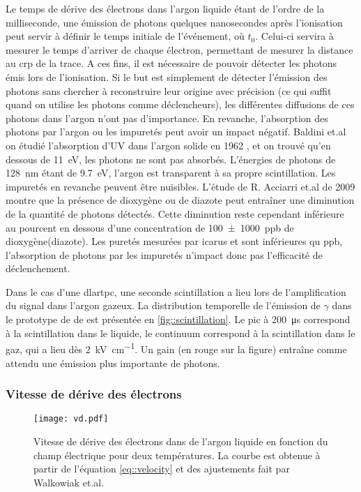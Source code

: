         Le temps de dérive des électrons dans l'argon liquide étant de l'ordre de la milliseconde, une émission de photons quelques nanosecondes après l'ionisation peut servir à définir le temps initiale de l'événement, où $t_0$. Celui-ci servira à mesurer le temps d'arriver de chaque électron, permettant de mesurer la distance au \gls{crp} de la trace. A ces fins, il est nécessaire de pouvoir détecter les photons émis lors de l'ionisation. Si le but est simplement de détecter l'émission des photons sans chercher à reconstruire leur origine avec précision (ce qui suffit quand on utilise les photons comme déclencheurs), les différentes diffusions de ces photons dans l'argon n'ont pas d'importance. En revanche, l'absorption des photons par l'argon ou les impuretés peut avoir un impact négatif. Baldini et.al on étudié l'absorption d'UV dans l'argon solide en 1962 \cite{Baldini1962}, et on trouvé qu'en dessous de \SI{11}{\eV}, les photons ne sont pas absorbés. L'énergies de photons de \SI{128}{\nano\meter} étant de \SI{9.7}{\eV}, l'argon est transparent à sa propre scintillation. Les impuretés en revanche peuvent être nuisibles. L'étude de R. Acciarri et.al de 2009\cite{Acciarri2009} montre que la présence de dioxygène ou de diazote peut entraîner une diminution de la quantité de photons détectés. Cette diminution reste cependant inférieure au pourcent en dessous d'une concentration de \SI{100(1000)}{ppb} de dioxygène(diazote). Les puretés mesurées par \gls{icarus}\cite{Antonello2014} et \protosp{} sont inférieures qu \si{ppb}, l'absorption de photons par les impuretés n'impact donc pas l'efficacité de déclenchement.

        Dans le cas d'une \gls{dlartpc}, une seconde scintillation a lieu lors de l'amplification du signal dans l'argon gazeux. La distribution temporelle de l'émission de $\gamma$ dans le prototype de \TOO{} de  \protodp{} est présentée en \autoref{fig::scintillation}. Le pic à \SI{200}{\micro\second} correspond à la scintillation dans le liquide, le continuum correspond à la scintillation dans le gaz, qui a lieu dès \SI{2}{\kilo\volt\per\centi\meter}. Un gain (en rouge sur la figure) entraîne comme attendu une émission plus importante de photons.

      \subsubsection{Vitesse de dérive des électrons}

        \begin{figure}[htbp]
          \centering
          \texttt{[image: vd.pdf]}
          \caption[Vitesse de dérive des électrons dans de l'argon liquide en fonction du champ électrique.]{\label{fig::velocity}Vitesse de dérive des électrons dans de l'argon liquide en fonction du champ électrique pour deux températures. La courbe est obtenue à partir de l'équation \eqref{eq::velocity} et des ajustements fait par Walkowiak et.al\cite{Walkowiak2000}.}
        \end{figure}

